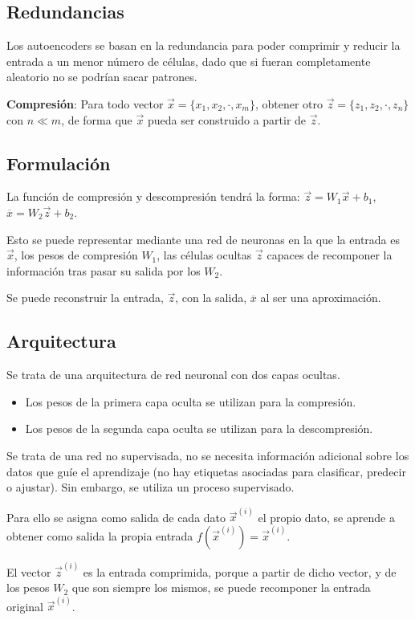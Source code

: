 \documentclass[12pt, twoside, openright]{report} %
\begin{document}
\subsection{Redundancias}
Los autoencoders se basan en la redundancia para poder comprimir y reducir la entrada a un menor número de células, dado que si fueran completamente aleatorio no se podrían sacar patrones.

\textbf{Compresión}: Para todo vector $\vec{x}=\{x_1, x_2,\cdot, x_m\}$, obtener otro $\vec{z}=\{z_1, z_2,\cdot, z_n\}$ con $n \ll m$, de forma que $\vec{x}$ pueda ser construido a partir de $\vec{z}$.

\subsection{Formulación}
La función de compresión y descompresión tendrá la forma: $\vec{z}=W_1\vec{x}+b_1$, $\overline{x}=W_2\vec{z}+b_2$.

Esto se puede representar mediante una red de neuronas en la que la entrada es $\vec{x}$, los pesos de compresión $W_1$, las células ocultas $\vec{z}$ capaces de recomponer la información tras pasar su salida por los $W_2$.

Se puede reconstruir la entrada, $\vec{z}$, con la salida, $\overline{x}$ al ser una aproximación.

\subsection{Arquitectura}
Se trata de una arquitectura de red neuronal con dos capas ocultas.
\begin{itemize}
	\item Los pesos de la primera capa oculta se utilizan para la compresión.
	\item Los pesos de la segunda capa oculta se utilizan para la descompresión.
\end{itemize}

Se trata de una red no supervisada, no se necesita información adicional sobre los datos que guíe el aprendizaje (no hay etiquetas asociadas para clasificar, predecir o ajustar). Sin embargo, se utiliza un proceso supervisado.

Para ello se asigna como salida de cada dato $\vec{x}^{(i)}$ el propio dato, se aprende a obtener como salida la propia entrada $f(\vec{x}^{(i)}) = \vec{x}^{(i)}$.

El vector $\vec{z}^{(i)}$ es la entrada comprimida, porque a partir de dicho vector, y de los pesos $W_2$ que son siempre los mismos, se puede recomponer la entrada original $\vec{x}^{(i)}$.
\end{document}
